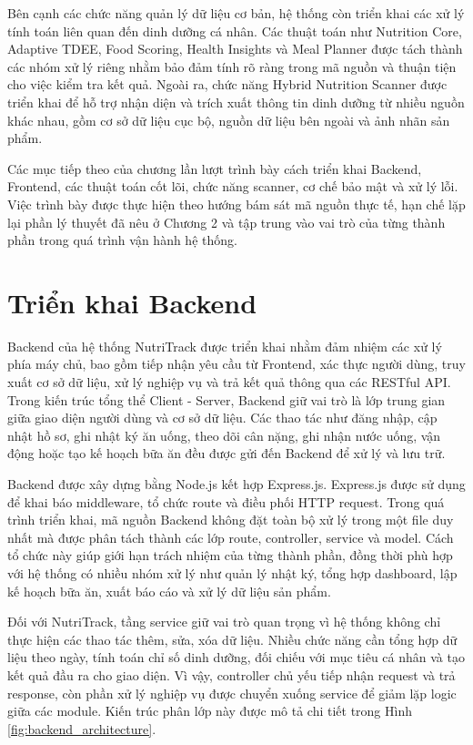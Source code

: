\documentclass[12pt, a4paper]{report}
\begin{document}
Bên cạnh các chức năng quản lý dữ liệu cơ bản, hệ thống còn triển khai các xử lý tính toán liên quan đến dinh dưỡng cá nhân. Các thuật toán như Nutrition Core, Adaptive TDEE, Food Scoring, Health Insights và Meal Planner được tách thành các nhóm xử lý riêng nhằm bảo đảm tính rõ ràng trong mã nguồn và thuận tiện cho việc kiểm tra kết quả. Ngoài ra, chức năng Hybrid Nutrition Scanner được triển khai để hỗ trợ nhận diện và trích xuất thông tin dinh dưỡng từ nhiều nguồn khác nhau, gồm cơ sở dữ liệu cục bộ, nguồn dữ liệu bên ngoài và ảnh nhãn sản phẩm.

Các mục tiếp theo của chương lần lượt trình bày cách triển khai Backend, Frontend, các thuật toán cốt lõi, chức năng scanner, cơ chế bảo mật và xử lý lỗi. Việc trình bày được thực hiện theo hướng bám sát mã nguồn thực tế, hạn chế lặp lại phần lý thuyết đã nêu ở Chương 2 và tập trung vào vai trò của từng thành phần trong quá trình vận hành hệ thống.

\section{Triển khai Backend}Backend của hệ thống NutriTrack được triển khai nhằm đảm nhiệm các xử lý phía máy chủ, bao gồm tiếp nhận yêu cầu từ Frontend, xác thực người dùng, truy xuất cơ sở dữ liệu, xử lý nghiệp vụ và trả kết quả thông qua các RESTful API. Trong kiến trúc tổng thể Client - Server, Backend giữ vai trò là lớp trung gian giữa giao diện người dùng và cơ sở dữ liệu. Các thao tác như đăng nhập, cập nhật hồ sơ, ghi nhật ký ăn uống, theo dõi cân nặng, ghi nhận nước uống, vận động hoặc tạo kế hoạch bữa ăn đều được gửi đến Backend để xử lý và lưu trữ.

Backend được xây dựng bằng Node.js kết hợp Express.js. Express.js được sử dụng để khai báo middleware, tổ chức route và điều phối HTTP request. Trong quá trình triển khai, mã nguồn Backend không đặt toàn bộ xử lý trong một file duy nhất mà được phân tách thành các lớp route, controller, service và model. Cách tổ chức này giúp giới hạn trách nhiệm của từng thành phần, đồng thời phù hợp với hệ thống có nhiều nhóm xử lý như quản lý nhật ký, tổng hợp dashboard, lập kế hoạch bữa ăn, xuất báo cáo và xử lý dữ liệu sản phẩm.

Đối với NutriTrack, tầng service giữ vai trò quan trọng vì hệ thống không chỉ thực hiện các thao tác thêm, sửa, xóa dữ liệu. Nhiều chức năng cần tổng hợp dữ liệu theo ngày, tính toán chỉ số dinh dưỡng, đối chiếu với mục tiêu cá nhân và tạo kết quả đầu ra cho giao diện. Vì vậy, controller chủ yếu tiếp nhận request và trả response, còn phần xử lý nghiệp vụ được chuyển xuống service để giảm lặp logic giữa các module. Kiến trúc phân lớp này được mô tả chi tiết trong Hình \ref{fig:backend_architecture}.
\end{document}
